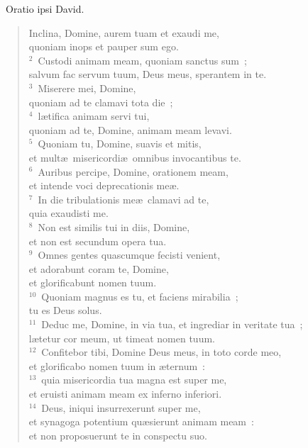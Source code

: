 ~\lettrine[lines=10,image=true,loversize=0.05,lraise=-0.03]{O}{}ratio ipsi David. \begin{flushleft}\begin{verse}\vspace{6pt}Inclina, Domine, aurem tuam et exaudi me,\\ quoniam inops et pauper sum ego.\\
${}^{2}$~Custodi animam meam, quoniam sanctus sum~;\\ salvum fac servum tuum, Deus meus, sperantem in te.\\
${}^{3}$~Miserere mei, Domine,\\ quoniam ad te clamavi tota die~;\\
${}^{4}$~l\ae tifica animam servi tui,\\ quoniam ad te, Domine, animam meam levavi.\\
${}^{5}$~Quoniam tu, Domine, suavis et mitis,\\ et mult\ae\ misericordi\ae\ omnibus invocantibus te.\\
${}^{6}$~Auribus percipe, Domine, orationem meam,\\ et intende voci deprecationis me\ae .\\
${}^{7}$~In die tribulationis me\ae\ clamavi ad te,\\ quia exaudisti me.\\
${}^{8}$~Non est similis tui in diis, Domine,\\ et non est secundum opera tua.\\
${}^{9}$~Omnes gentes quascumque fecisti venient,\\ et adorabunt coram te, Domine,\\ et glorificabunt nomen tuum.\\
${}^{10}$~Quoniam magnus es tu, et faciens mirabilia~;\\ tu es Deus solus.\\
${}^{11}$~Deduc me, Domine, in via tua, et ingrediar in veritate tua~;\\ l\ae tetur cor meum, ut timeat nomen tuum.\\
${}^{12}$~Confitebor tibi, Domine Deus meus, in toto corde meo,\\ et glorificabo nomen tuum in \ae ternum~:\\
${}^{13}$~quia misericordia tua magna est super me,\\ et eruisti animam meam ex inferno inferiori.\\
${}^{14}$~Deus, iniqui insurrexerunt super me,\\ et synagoga potentium qu\ae sierunt animam meam~:\\ et non proposuerunt te in conspectu suo.\\

\end{verse}
\end{flushleft}
